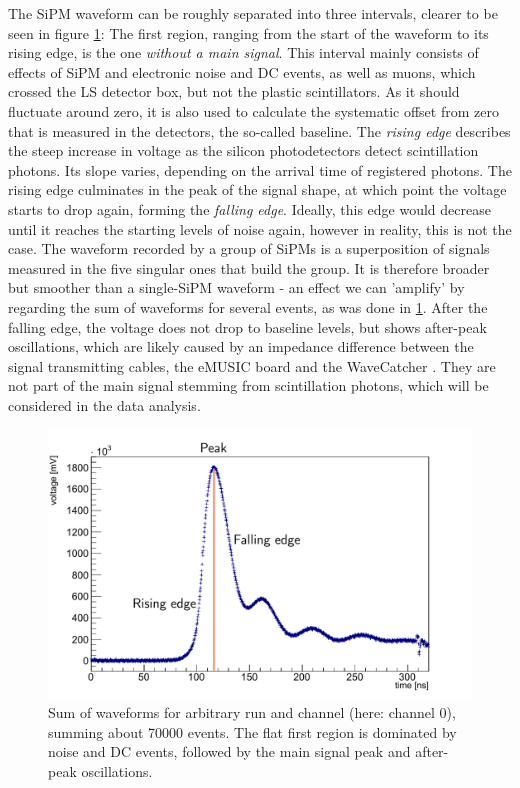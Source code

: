 	The \ac{SiPM} waveform can be roughly separated into three intervals, clearer to be seen in figure \ref{fig:waveform-sum}:
	The first region, ranging from the start of the waveform to its rising edge, is the one \textit{without a main signal}. This interval mainly consists of effects of \ac{SiPM} and electronic noise and \ac{DC} events, as well as muons, which crossed the \ac{LS} detector box, but not the plastic scintillators. As it should fluctuate around zero, it is also used to calculate the systematic offset from zero that is measured in the detectors, the so-called baseline.
	The \textit{rising edge} describes the steep increase in voltage as the silicon photodetectors detect scintillation photons. Its slope varies, depending on the arrival time of registered photons. 
	The rising edge culminates in the peak of the signal shape, at which point the voltage starts to drop again, forming the \textit{falling edge}. Ideally, this edge would decrease until it reaches the starting levels of noise again, however in reality,  this is not the case. The waveform recorded by a group of \acsp{SiPM} is a superposition of signals measured in the five singular ones that build the group. It is therefore broader but smoother than a single-\ac{SiPM} waveform - an effect we can 'amplify' by regarding the sum of waveforms for several events, as was done in \ref{fig:waveform-sum}. After the falling edge, the voltage does not drop to baseline levels, but shows after-peak oscillations, which are likely caused by an impedance difference between the signal transmitting cables, the eMUSIC board and the WaveCatcher \cite{ZACHARIAS}. They are not part of the main signal stemming from scintillation photons, which will be considered in the data analysis.
	
	
	
	
	\begin{figure}[h]
		\centering
		\includegraphics[width=.7\textwidth]{pictures/waveform-sum.pdf}
		\caption{Sum of waveforms for arbitrary run and channel (here: channel 0), summing about \num{70000} events. The flat first region is dominated by noise and \ac{DC} events, followed by the main signal peak and after-peak oscillations.}
		\label{fig:waveform-sum}
	\end{figure}
    
